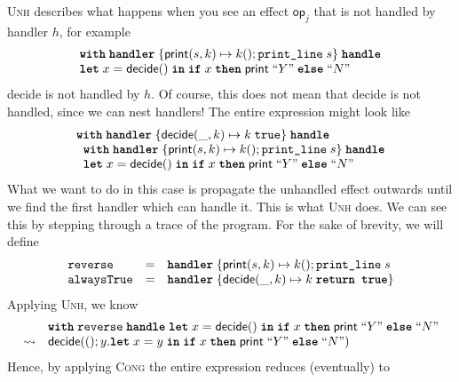 \textsc{Unh} describes what happens when you see an effect $\textsf{op}_j$ that is not handled by handler $h$, for example
\[\begin{array}{l}
     \textbf{\texttt{with}} \; \textbf{\texttt{handler}} \; \{ \textsf{print}(s, k) \mapsto k(); \texttt{print\_line} \; s \} \; \textbf{\texttt{handle}}\\
     \textbf{\texttt{let}}\; x = \textsf{decide}()\; \textbf{\texttt{in}} \; \textbf{\texttt{if}} \; x \; \textbf{\texttt{then}} \; \textsf{print} \; ``Y" \; \textbf{\texttt{else}} \; ``N"
\end{array}\]
\textsf{decide} is not handled by $h$. Of course, this does not mean that \textsf{decide} is not handled, since we can nest handlers! The entire expression might look like
\[\begin{array}{l}
    \textbf{\texttt{with}} \; \textbf{\texttt{handler}} \; \{ \textsf{decide}(\_, k) \mapsto k \; \texttt{true} \} \; \textbf{\texttt{handle}} \\
     \; \; \textbf{\texttt{with}} \; \textbf{\texttt{handler}} \; \{ \textsf{print}(s, k) \mapsto k(); \texttt{print\_line} \; s \} \; \textbf{\texttt{handle}}\\
     \; \; \textbf{\texttt{let}}\; x = \textsf{decide}()\; \textbf{\texttt{in}} \; \textbf{\texttt{if}} \; x \; \textbf{\texttt{then}} \; \textsf{print} \; ``Y" \; \textbf{\texttt{else}} \; ``N"
\end{array}\]
What we want to do in this case is propagate the unhandled effect outwards until we find the first handler which can handle it. This is what \textsc{Unh} does. We can see this by stepping through a trace of the program. For the sake of brevity, we will define
\[\begin{array}{lll}
    \texttt{reverse} & = & \textbf{\texttt{handler}} \; \{ \textsf{print}(s, k) \mapsto k(); \texttt{print\_line} \; s \\
    \texttt{alwaysTrue} & = & \textbf{\texttt{handler}} \; \{ \textsf{decide}(\_, k) \mapsto k \; \textbf{\texttt{return true}} \}
\end{array}\]
Applying \textsc{Unh}, we know
\[\begin{array}{ll}
     & \textbf{\texttt{with}} \; \texttt{reverse} \; \textbf{\texttt{handle}} \;
     \textbf{\texttt{let}}\; x = \textsf{decide}()\; \textbf{\texttt{in}} \; \textbf{\texttt{if}} \; x \; \textbf{\texttt{then}} \; \textsf{print} \; ``Y" \; \textbf{\texttt{else}} \; ``N" \\
     \leadsto & \textsf{decide}((); y. \textbf{\texttt{let}} \; x = y \; \textbf{\texttt{in}} \; \textbf{\texttt{if}} \; x \; \textbf{\texttt{then}} \; \textsf{print} \; ``Y" \; \textbf{\texttt{else}} \; ``N")
\end{array}\]
Hence, by applying \textsc{Cong} the entire expression reduces (eventually) to
